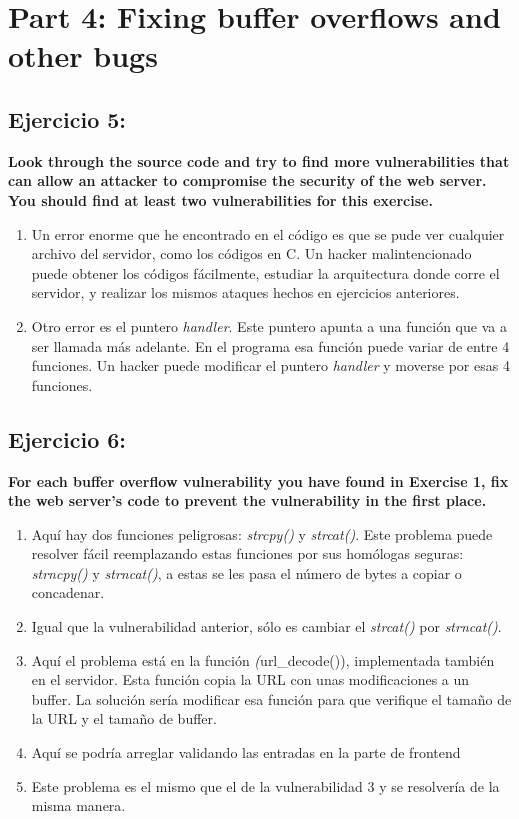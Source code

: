 \documentclass[a4paper,12pt]{article}
\begin{document}
\section{Part 4: Fixing buffer overflows and other bugs}

\subsection{Ejercicio 5:}

\textbf{Look through the source code and try to find more vulnerabilities that can allow an attacker to compromise
the security of the web server. You should find at least two vulnerabilities for this exercise.}

\begin{enumerate}
 \item Un error enorme que he encontrado en el código es que se pude ver cualquier archivo del servidor, como los códigos
 en C. Un hacker malintencionado puede obtener los códigos fácilmente, estudiar la arquitectura donde corre el servidor, y realizar
 los mismos ataques hechos en ejercicios anteriores.
 \item Otro error es el puntero \textit{handler}. Este puntero apunta a una función que va a ser llamada más adelante. En
 el programa esa función puede variar de entre 4 funciones. Un hacker puede modificar el puntero \textit{handler} y moverse
 por esas 4 funciones.
\end{enumerate}

\subsection{Ejercicio 6:}

\textbf{For each buffer overflow vulnerability you have found in Exercise 1, 
fix the web server's code to prevent the vulnerability in the first place.}

\begin{enumerate}
 \item Aquí hay dos funciones peligrosas: \textit{strcpy()} y \textit{strcat()}. Este problema puede resolver fácil
 reemplazando estas funciones por sus homólogas seguras: \textit{strncpy()} y \textit{strncat()}, a estas se les pasa
 el número de bytes a copiar o concadenar.
 \item Igual que la vulnerabilidad anterior, sólo es cambiar el \textit{strcat()} por \textit{strncat()}.
 \item Aquí el problema está en la función \textit(url\_decode()), implementada también en el servidor. Esta función copia
 la URL con unas modificaciones a un buffer. La solución sería modificar esa función para que verifique el tamaño de
 la URL y el tamaño de buffer.
 \item Aquí se podría arreglar validando las entradas en la parte de frontend
 \item Este problema es el mismo que el de la vulnerabilidad 3 y se resolvería de la misma manera.
\end{enumerate}
\end{document}
